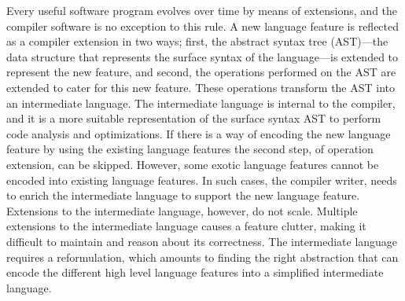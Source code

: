 \documentclass[screen,nonacm,manuscript,review]{acmart} %
\begin{document}
Every useful software program evolves over time by means of
extensions, and the compiler software is no exception to
this rule. A new language feature is reflected as
a compiler extension in two ways; first,
the abstract syntax tree (AST)---the data structure that represents
the surface syntax of the language---is extended to represent the new
feature, and second, the operations performed on the AST are extended
to cater for this new feature. These operations transform the AST into
an intermediate language. The intermediate language is internal to the
compiler\cite{siek_compilation_2023}, and it is a more suitable
representation of the surface syntax AST to perform code analysis and
optimizations\cite{aho_compilers_1986}.
If there is a way of encoding the new language feature by using the
existing language features the second step, of operation extension, can be
skipped. However, some exotic language features cannot be encoded
into existing language features. In such cases, the compiler writer, needs
to enrich the intermediate language to support the
new language feature. Extensions to the intermediate language,
however, do not scale. Multiple extensions to the intermediate
language causes a feature clutter, making it difficult to
maintain and reason about its correctness. The intermediate language
requires a reformulation, which amounts to finding the right
abstraction that can encode the different high level language features
into a simplified intermediate language.
\end{document}

